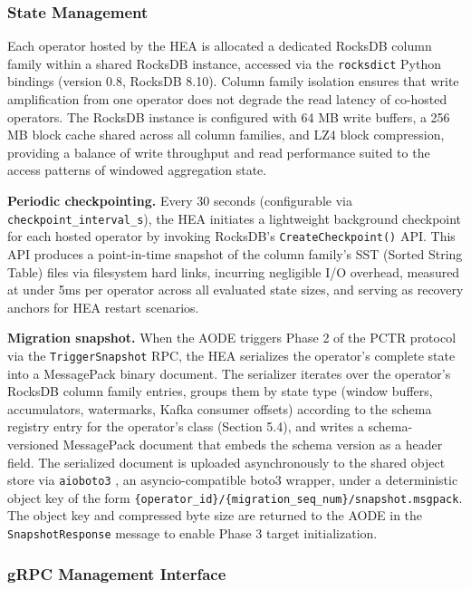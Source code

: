 \documentclass[preprint,review,12pt]{elsarticle}
\begin{document}
\subsubsection{State Management}\label{state-management}

Each operator hosted by the HEA is allocated a dedicated RocksDB column family within a shared RocksDB instance, accessed via the \texttt{rocksdict} Python bindings (version 0.8, RocksDB 8.10). Column family isolation ensures that write amplification from one operator does not degrade the read latency of co-hosted operators. The RocksDB instance is configured with 64 MB write buffers, a 256 MB block cache shared across all column families, and LZ4 block compression, providing a balance of write throughput and read performance suited to the access patterns of windowed aggregation state.

\textbf{Periodic checkpointing.} Every 30 seconds (configurable via \texttt{checkpoint\_interval\_s}), the HEA initiates a lightweight background checkpoint for each hosted operator by invoking RocksDB's \texttt{CreateCheckpoint()} API. This API produces a point-in-time snapshot of the column family's SST (Sorted String Table) files via filesystem hard links, incurring negligible I/O overhead, measured at under 5ms per operator across all evaluated state sizes, and serving as recovery anchors for HEA restart scenarios.

\textbf{Migration snapshot.} When the AODE triggers Phase 2 of the PCTR protocol via the \texttt{TriggerSnapshot} RPC, the HEA serializes the operator's complete state into a MessagePack binary document. The serializer iterates over the operator's RocksDB column family entries, groups them by state type (window buffers, accumulators, watermarks, Kafka consumer offsets) according to the schema registry entry for the operator's class (Section 5.4), and writes a schema-versioned MessagePack document that embeds the schema version as a header field. The serialized document is uploaded asynchronously to the shared object store via \texttt{aioboto3} \cite{aioboto3_2024}, an asyncio-compatible boto3 wrapper, under a deterministic object key of the form \texttt{\{operator\_id\}/\{migration\_seq\_num\}/snapshot.msgpack}. The object key and compressed byte size are returned to the AODE in the \texttt{SnapshotResponse} message to enable Phase 3 target initialization.

\subsubsection{gRPC Management Interface}\label{grpc-management-interface}
\end{document}
